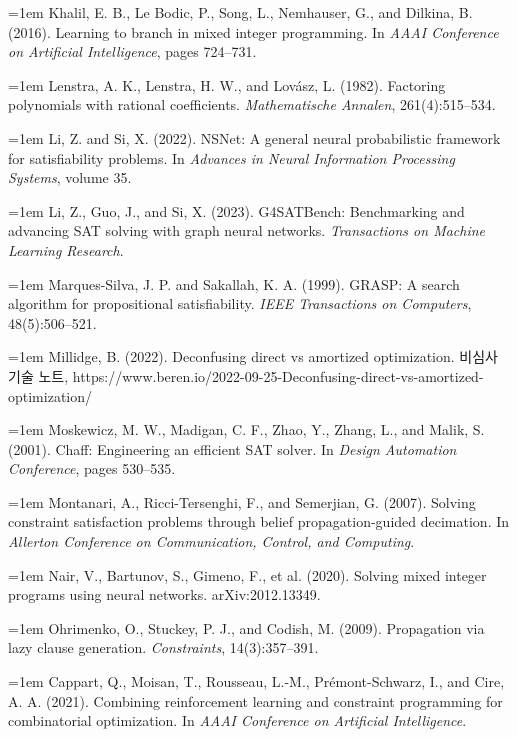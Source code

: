 \documentclass[final,5p,twocolumn]{elsarticle}
\begin{document}
{\noindent\hangindent=1em Khalil, E. B., Le Bodic, P., Song, L., Nemhauser, G., and Dilkina, B. (2016). Learning to branch in mixed integer programming. In \textit{AAAI Conference on Artificial Intelligence}, pages 724–731.\par\smallskip
\noindent\hangindent=1em Lenstra, A. K., Lenstra, H. W., and Lovász, L. (1982). Factoring polynomials with rational coefficients. \textit{Mathematische Annalen}, 261(4):515–534.\par\smallskip
\noindent\hangindent=1em Li, Z. and Si, X. (2022). NSNet: A general neural probabilistic framework for satisfiability problems. In \textit{Advances in Neural Information Processing Systems}, volume 35.\par\smallskip
\noindent\hangindent=1em Li, Z., Guo, J., and Si, X. (2023). G4SATBench: Benchmarking and advancing SAT solving with graph neural networks. \textit{Transactions on Machine Learning Research}.\par\smallskip
\noindent\hangindent=1em Marques-Silva, J. P. and Sakallah, K. A. (1999). GRASP: A search algorithm for propositional satisfiability. \textit{IEEE Transactions on Computers}, 48(5):506–521.\par\smallskip
\noindent\hangindent=1em Millidge, B. (2022). Deconfusing direct vs amortized optimization. 비심사 기술 노트, https://www.beren.io/2022-09-25-Deconfusing-direct-vs-amortized-optimization/\par\smallskip
\noindent\hangindent=1em Moskewicz, M. W., Madigan, C. F., Zhao, Y., Zhang, L., and Malik, S. (2001). Chaff: Engineering an efficient SAT solver. In \textit{Design Automation Conference}, pages 530–535.\par\smallskip
\noindent\hangindent=1em Montanari, A., Ricci-Tersenghi, F., and Semerjian, G. (2007). Solving constraint satisfaction problems through belief propagation-guided decimation. In \textit{Allerton Conference on Communication, Control, and Computing}.\par\smallskip
\noindent\hangindent=1em Nair, V., Bartunov, S., Gimeno, F., et al. (2020). Solving mixed integer programs using neural networks. arXiv:2012.13349.\par\smallskip
\noindent\hangindent=1em Ohrimenko, O., Stuckey, P. J., and Codish, M. (2009). Propagation via lazy clause generation. \textit{Constraints}, 14(3):357–391.\par\smallskip
\noindent\hangindent=1em Cappart, Q., Moisan, T., Rousseau, L.-M., Prémont-Schwarz, I., and Cire, A. A. (2021). Combining reinforcement learning and constraint programming for combinatorial optimization. In \textit{AAAI Conference on Artificial Intelligence}.\par\smallskip
}
\end{document}
